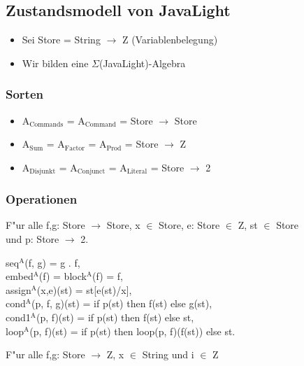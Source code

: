 \documentclass[11pt]{article}
\begin{document}
\subsection{Zustandsmodell von JavaLight}
\label{sec-4-8}
\begin{itemize}
\item Sei Store = String $\to$ Z (Variablenbelegung)

\item Wir bilden eine $\Sigma$(JavaLight)-Algebra
\end{itemize}

\subsubsection{Sorten}
\label{sec-4-8-1}
\begin{itemize}
\item A$_{\text{Commands}}$ = A$_{\text{Command}}$ = Store $\to$ Store
\item A$_{\text{Sum}}$ = A$_{\text{Factor}}$ = A$_{\text{Prod}}$ = Store $\to$ Z
\item A$_{\text{Disjunkt}}$ = A$_{\text{Conjunct}}$ = A$_{\text{Literal}}$ = Store $\to$ 2
\end{itemize}

\subsubsection{Operationen}
\label{sec-4-8-2}
F"ur alle f,g: Store $\to$ Store, x $\in$ Store, e: Store $\in$ Z, st $\in$ Store \\ und p: Store $\to$ 2.

\begin{center}
seq$^{\text{A}}$(f, g) = g . f, \\
embed$^{\text{A}}$(f) = block$^{\text{A}}$(f) = f, \\
assign$^{\text{A}}$(x,e)(st) = st[e(st)/x], \\
cond$^{\text{A}}$(p, f, g)(st) = if p(st) then f(st) else g(st), \\
cond1$^{\text{A}}$(p, f)(st) = if p(st) then f(st) else st, \\
loop$^{\text{A}}$(p, f)(st) = if p(st) then loop(p, f)(f(st)) else st. \\
\end{center}

F"ur alle f,g: Store $\to$ Z, x $\in$ String und i $\in$ Z
\end{document}
